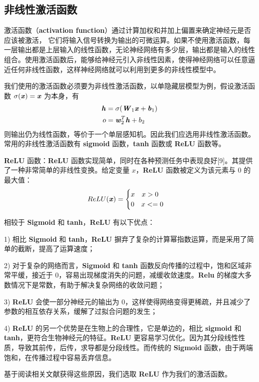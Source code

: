     \subsection{非线性激活函数}
        \par 激活函数（\textbf{activation function}）通过计算加权和并加上偏置来确定神经元是否应该被激活， 它们将输入信号转换为输出的可微运算。如果不使用激活函数，每一层输出都是上层输入的线性函数，无论神经网络有多少层，输出都是输入的线性组合。使用激活函数后，能够给神经元引入非线性因素，使得神经网络可以任意逼近任何非线性函数，这样神经网络就可以利用到更多的非线性模型中。
        \par 我们使用的激活函数必须要为非线性激活函数，以单隐藏层模型为例，假设激活函数 $\sigma(\textbf{\textit{x}})=\textbf{\textit{x}}$ 为本身，有 \begin{align*} \textbf{\textit{h}} &= \sigma(\textbf{\textit{W}}_1\textbf{\textit{x}} + \textbf{\textit{b}}_1) \\ o &= \textbf{\textit{w}}_2^T\textbf{\textit{h}} + b_2\end{align*}则输出仍为线性函数，等价于一个单层感知机。因此我们应选用非线性激活函数。常用的非线性激活函数有 \textbf{sigmoid} 函数，\textbf{tanh} 函数或 \textbf{ReLU} 函数等。
        \par \textbf{ReLU} 函数：\textbf{ReLU} 函数实现简单，同时在各种预测任务中表现良好[9]。其提供了一种非常简单的非线性变换。给定变量 $x$，\textbf{ReLU} 函数被定义为该元素与 $0$ 的最大值：$$ReLU(\textbf{\textit{x}}) = \begin{cases}
            x \quad x > 0 \\ 0 \quad x <= 0
        \end{cases}$$
        \par 相较于 \textbf{Sigmoid} 和 \textbf{tanh}，\textbf{ReLU} 有以下优点：
        \par 1) 相比 \textbf{Sigmoid} 和 \textbf{tanh}，\textbf{ReLU} 摒弃了复杂的计算幂指数运算，而是采用了简单的截断，提高了运算速度；
        \par 2) 对于复杂的网络而言，\textbf{Sigmoid} 和 \textbf{tanh} 函数反向传播的过程中，饱和区域非常平缓，接近于 $0$，容易出现梯度消失的问题，减缓收敛速度。\textbf{Relu} 的梯度大多数情况下是常数，有助于解决复杂网络的收敛问题；
        \par 3) \textbf{ReLU} 会使一部分神经元的输出为 $0$，这样使得网络变得更稀疏，并且减少了参数的相互依存关系，缓解了过拟合问题的发生；
        \par 4) \textbf{ReLU} 的另一个优势是在生物上的合理性，它是单边的，相比 \textbf{sigmoid} 和 \textbf{tanh}，更符合生物神经元的特征。\textbf{ReLU} 更容易学习优化。因为其分段线性性质，导致其前传，后传，求导都是分段线性。而传统的 \textbf{Sigmoid} 函数，由于两端饱和，在传播过程中容易丢弃信息\cite{ref9}。
        \par 基于阅读相关文献获得这些原因，我们选取 \textbf{ReLU} 作为我们的激活函数。
    
